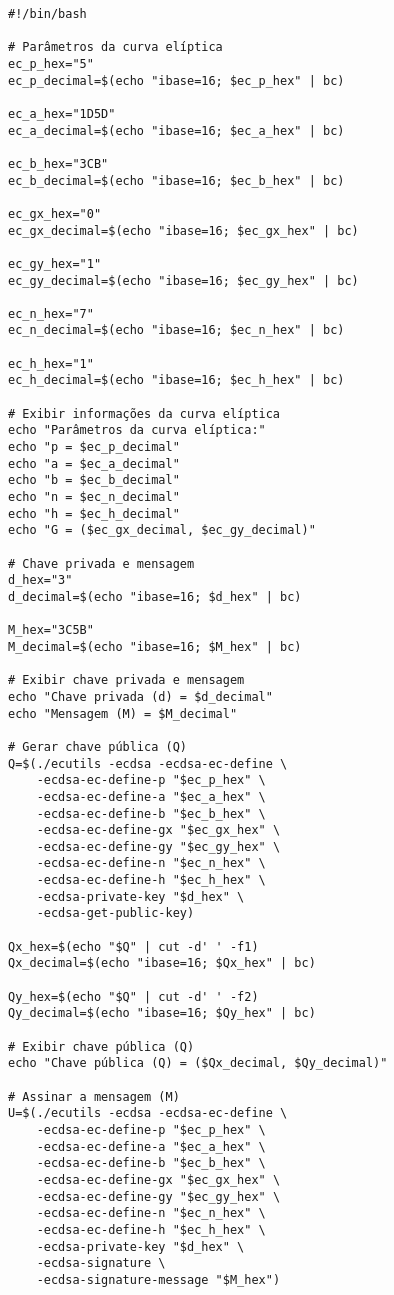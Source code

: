  \label{anexo:c054fabc-cd0a-4724-b7e3-63d39dc9fa55}
\begin{verbatim}
#!/bin/bash

# Parâmetros da curva elíptica
ec_p_hex="5"
ec_p_decimal=$(echo "ibase=16; $ec_p_hex" | bc)

ec_a_hex="1D5D"
ec_a_decimal=$(echo "ibase=16; $ec_a_hex" | bc)

ec_b_hex="3CB"
ec_b_decimal=$(echo "ibase=16; $ec_b_hex" | bc)

ec_gx_hex="0"
ec_gx_decimal=$(echo "ibase=16; $ec_gx_hex" | bc)

ec_gy_hex="1"
ec_gy_decimal=$(echo "ibase=16; $ec_gy_hex" | bc)

ec_n_hex="7"
ec_n_decimal=$(echo "ibase=16; $ec_n_hex" | bc)

ec_h_hex="1"
ec_h_decimal=$(echo "ibase=16; $ec_h_hex" | bc)

# Exibir informações da curva elíptica
echo "Parâmetros da curva elíptica:"
echo "p = $ec_p_decimal"
echo "a = $ec_a_decimal"
echo "b = $ec_b_decimal"
echo "n = $ec_n_decimal"
echo "h = $ec_h_decimal"
echo "G = ($ec_gx_decimal, $ec_gy_decimal)"

# Chave privada e mensagem
d_hex="3"
d_decimal=$(echo "ibase=16; $d_hex" | bc)

M_hex="3C5B"
M_decimal=$(echo "ibase=16; $M_hex" | bc)

# Exibir chave privada e mensagem
echo "Chave privada (d) = $d_decimal"
echo "Mensagem (M) = $M_decimal"

# Gerar chave pública (Q)
Q=$(./ecutils -ecdsa -ecdsa-ec-define \
    -ecdsa-ec-define-p "$ec_p_hex" \
    -ecdsa-ec-define-a "$ec_a_hex" \
    -ecdsa-ec-define-b "$ec_b_hex" \
    -ecdsa-ec-define-gx "$ec_gx_hex" \
    -ecdsa-ec-define-gy "$ec_gy_hex" \
    -ecdsa-ec-define-n "$ec_n_hex" \
    -ecdsa-ec-define-h "$ec_h_hex" \
    -ecdsa-private-key "$d_hex" \
    -ecdsa-get-public-key)

Qx_hex=$(echo "$Q" | cut -d' ' -f1)
Qx_decimal=$(echo "ibase=16; $Qx_hex" | bc)

Qy_hex=$(echo "$Q" | cut -d' ' -f2)
Qy_decimal=$(echo "ibase=16; $Qy_hex" | bc)

# Exibir chave pública (Q)
echo "Chave pública (Q) = ($Qx_decimal, $Qy_decimal)"

# Assinar a mensagem (M)
U=$(./ecutils -ecdsa -ecdsa-ec-define \
    -ecdsa-ec-define-p "$ec_p_hex" \
    -ecdsa-ec-define-a "$ec_a_hex" \
    -ecdsa-ec-define-b "$ec_b_hex" \
    -ecdsa-ec-define-gx "$ec_gx_hex" \
    -ecdsa-ec-define-gy "$ec_gy_hex" \
    -ecdsa-ec-define-n "$ec_n_hex" \
    -ecdsa-ec-define-h "$ec_h_hex" \
    -ecdsa-private-key "$d_hex" \
    -ecdsa-signature \
    -ecdsa-signature-message "$M_hex")


\end{verbatim}
